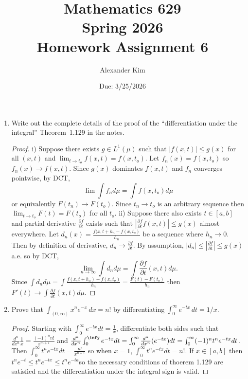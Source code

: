 \documentclass[12pt]{article}
\title{Mathematics 629\\
Spring 2026\\
Homework Assignment 6}
\author{Alexander Kim}
\date{Due: 3/25/2026}
\begin{document}
\maketitle

\begin{enumerate}

	\item Write out the complete details of the proof of the ``differentiation under the integral'' Theorem~1.129 in the notes.

	      \begin{proof}
		      i) Suppose there exists $g \in L^1(\mu)$ such that $|f(x,t)| \leq g(x)$ for all $(x,t)$ and $\lim_{t\to t_o} f(x,t) = f(x,t_o)$. Let $f_n(x) = f(x, t_o)$ so $f_n(x) \to f(x,t)$. Since $g(x)$ dominates $f(x,t)$ and $f_n$ converges pointwise, by DCT,
		      $$\lim \int f_n d\mu = \int f(x,t_o) d\mu$$
		      or equivalently $F(t_n)\to F(t_o)$. Since $t_n \to t_o$ is an arbitrary sequence then
		      $\lim_{t\to t_o} F(t) = F(t_o)$ for all $t_o$.
		      \newline
		      ii) Suppose there also exists $t\in [a,b]$ and partial derivative $\frac{\partial f}{\partial t}$ exists such that $|\frac{\partial f}{\partial t} f(x,t)| \leq g(x)$ almost everywhere.
		      Let $d_n(x) = \frac{f(x,t + h_n - f(x, t_o)}{h_n}$ be a sequence where $h_n \to 0$. Then by definition of derivative, $d_n\to \frac{\partial f}{\partial t}$. By assumption, $|d_n| \leq |\frac{\partial f}{\partial t}| \leq g(x)$ a.e. so by DCT,
		      $$\lim_{n\to \infty} \int d_n d\mu = \int \frac{\partial f}{\partial t}(x,t) d\mu.$$
		      Since $\int d_n d\mu = \int  \frac{f(x,t + h_n) - f(x, t_o)}{h_n} = \frac{F(t) - F(t_o)}{h_n}$ then $F'(t) \to \int \frac{\partial f}{\partial t}(x,t) d\mu.$
	      \end{proof}

	\item Prove that $\int_{(0,\infty)} x^n e^{-x}\,dx = n!$ by differentiating $\int_0^\infty e^{-tx}\,dt = 1/x$.

	      \begin{proof}
		      Starting with $\int_0^\infty e^{-tx} dt = \frac{1}{x}$, differentiate both sides such that
		      $\frac{d^n}{dx^n} \frac{1}{x} = \frac{(-1)^n n!}{x^{m+1}}$ and
		      $\frac{d^n}{dx^n} \int_0^\infy e^{-tx}dt = \int_0^\infty \frac{d^n}{dx^n}(e^{-tx})dt = \int_0^\infty(-1)^n t^n e^{-tx}dt$. Then $\int_0^\infty t^n e^{-tx}dt = \frac{n!}{x^{n+1}}$ so when $x = 1$, $\int_0^\infty t^ne^{-tx}dt = n!$. If $x \in [a,b]$ then $t^ne^{-t} \leq t^ne^{-tx} \leq t^n e^{-ta}$so the necessary conditions of thoerem 1.129 are satisfied and the differentiation under the integral sign is valid.
	      \end{proof}


\end{enumerate}
\end{document}
